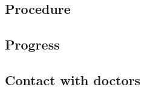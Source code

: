 \documentclass[11pt]{article}
\begin{document}
		\subsection{Procedure}
		
		\subsection{Progress}
		
		\subsection{Contact with doctors}
		
	\newpage
	
	\nocite{*}

    \raggedright
    
	
\end{document}
